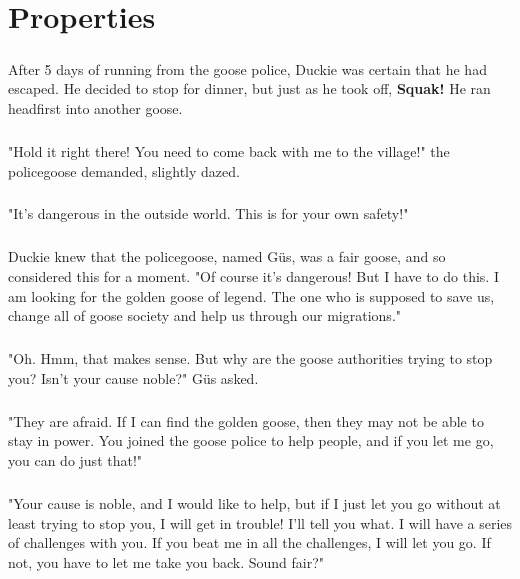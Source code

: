 \chapter{Properties}
\paragraph{} After 5 days of running from the goose police, Duckie was certain that he had escaped. He decided to stop for dinner, but just as he took off, \textbf{Squak!} He ran headfirst into another goose. 
\paragraph{} "Hold it right there! You need to come back with me to the village!" the policegoose demanded, slightly dazed. 
\paragraph{} "It's dangerous in the outside world. This is for your own safety!"
\paragraph{} Duckie knew that the policegoose, named Güs, was a fair goose, and so considered this for a moment. "Of course it's dangerous! But I have to do this. I am looking for the golden goose of legend. The one who is supposed to save us, change all of goose society and help us through our migrations."
\paragraph{} "Oh. Hmm, that makes sense. But why are the goose authorities trying to stop you? Isn't your cause noble?" Güs asked.
\paragraph{} "They are afraid. If I can find the golden goose, then they may not be able to stay in power. You joined the goose police to help people, and if you let me go, you can do just that!"
\paragraph{} "Your cause is noble, and I would like to help, but if I just let you go without at least trying to stop you, I will get in trouble! I'll tell you what. I will have a series of challenges with you. If you beat me in all the challenges, I will let you go. If not, you have to let me take you back. Sound fair?"
